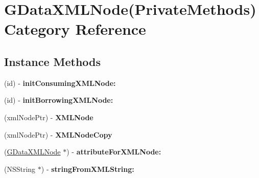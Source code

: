 \hypertarget{category_g_data_x_m_l_node_07_private_methods_08}{\section{G\+Data\+X\+M\+L\+Node(Private\+Methods) Category Reference}
\label{category_g_data_x_m_l_node_07_private_methods_08}
}
\subsection*{Instance Methods}
\begin{DoxyCompactItemize}
\item 
\hypertarget{category_g_data_x_m_l_node_07_private_methods_08_afe892d98b556fbab1381efd9fcde6819}{(id) -\/ {\bfseries init\+Consuming\+X\+M\+L\+Node\+:}}\label{category_g_data_x_m_l_node_07_private_methods_08_afe892d98b556fbab1381efd9fcde6819}

\item 
\hypertarget{category_g_data_x_m_l_node_07_private_methods_08_ac32928fffb81e4e96957c82e759fd192}{(id) -\/ {\bfseries init\+Borrowing\+X\+M\+L\+Node\+:}}\label{category_g_data_x_m_l_node_07_private_methods_08_ac32928fffb81e4e96957c82e759fd192}

\item 
\hypertarget{category_g_data_x_m_l_node_07_private_methods_08_a472c0a766d820c7774f5c587e32db00d}{(xml\+Node\+Ptr) -\/ {\bfseries X\+M\+L\+Node}}\label{category_g_data_x_m_l_node_07_private_methods_08_a472c0a766d820c7774f5c587e32db00d}

\item 
\hypertarget{category_g_data_x_m_l_node_07_private_methods_08_af9ab19e292ae4d18c6302f97f6e284f8}{(xml\+Node\+Ptr) -\/ {\bfseries X\+M\+L\+Node\+Copy}}\label{category_g_data_x_m_l_node_07_private_methods_08_af9ab19e292ae4d18c6302f97f6e284f8}

\item 
\hypertarget{category_g_data_x_m_l_node_07_private_methods_08_adbb4de0b3d2e31e5016413f28df8ab23}{(\hyperlink{interface_g_data_x_m_l_node}{G\+Data\+X\+M\+L\+Node} $\ast$) -\/ {\bfseries attribute\+For\+X\+M\+L\+Node\+:}}\label{category_g_data_x_m_l_node_07_private_methods_08_adbb4de0b3d2e31e5016413f28df8ab23}

\item 
\hypertarget{category_g_data_x_m_l_node_07_private_methods_08_aab0df9eaa8a836f244fc035ceada7901}{(N\+S\+String $\ast$) -\/ {\bfseries string\+From\+X\+M\+L\+String\+:}}\label{category_g_data_x_m_l_node_07_private_methods_08_aab0df9eaa8a836f244fc035ceada7901}


\end{DoxyCompactItemize}
